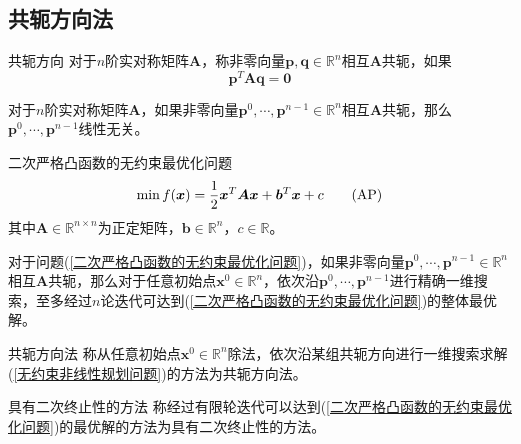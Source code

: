 \documentclass[lang = cn, scheme = chinese, thmcnt = section]{elegantbook}
\newcommand{\R}{\mathbb{R}}            %
\newcommand{\bs}{\boldsymbol}          %
\begin{document}
\subsection{共轭方向法}

\begin{definition}{共轭方向}
	对于$n$阶实对称矩阵$\bs{A}$，称非零向量$\bs{p},\bs{q}\in\R^n$相互$\bs{A}$共轭，如果
	$$
	\bs{p}^T\bs{A}\bs{q}=\bs{0}
	$$
\end{definition}

\begin{theorem}
	对于$n$阶实对称矩阵$\bs{A}$，如果非零向量$\bs{p}^0,\cdots,\bs{p}^{n-1}\in\R^n$相互$\bs{A}$共轭，那么$\bs{p}^0,\cdots,\bs{p}^{n-1}$线性无关。
\end{theorem}

\begin{definition}{二次严格凸函数的无约束最优化问题}
	\begin{equation}
		\label{二次严格凸函数的无约束最优化问题}\min f(\bs{x})=\frac{1}{2}\bs{x}^T\bs{Ax}+\bs{b}^T\bs{x}+c\tag{$\text{AP}$}
	\end{equation}
	其中$\bs{A}\in\R^{n\times n}$为正定矩阵，$\bs{b}\in \R^n$，$c\in\R$。
\end{definition}

\begin{theorem}
	对于问题(\ref{二次严格凸函数的无约束最优化问题})，如果非零向量$\bs{p}^0,\cdots,\bs{p}^{n-1}\in\R^n$相互$\bs{A}$共轭，那么对于任意初始点$\bs{x}^0\in\R^n$，依次沿$\bs{p}^0,\cdots,\bs{p}^{n-1}$进行精确一维搜索，至多经过$n$论迭代可达到(\ref{二次严格凸函数的无约束最优化问题})的整体最优解。
\end{theorem}

\begin{definition}{共轭方向法}
	称从任意初始点$\bs{x}^0\in\R^n$除法，依次沿某组共轭方向进行一维搜索求解(\ref{无约束非线性规划问题})的方法为共轭方向法。
\end{definition}

\begin{definition}{具有二次终止性的方法}
	称经过有限轮迭代可以达到(\ref{二次严格凸函数的无约束最优化问题})的最优解的方法为具有二次终止性的方法。
\end{definition}
\end{document}
